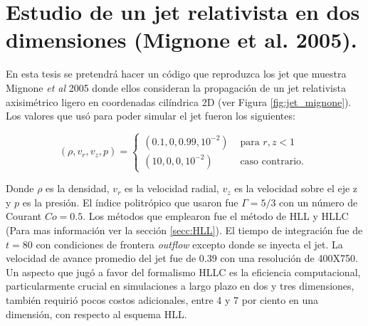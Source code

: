 \documentclass[12pt,a4paper]{book}
\begin{document}
\section{Estudio de un jet relativista en dos dimensiones (Mignone et al. 2005).}
En esta tesis se pretendrá hacer un código que reproduzca los jet que muestra Mignone \emph{et al} 2005 \cite{MB-HLLC-I} donde ellos consideran la propagación de un jet relativista axisimétrico ligero en 
coordenadas cilíndrica 2D (ver Figura \ref{fig:jet_mignone}). Los valores que usó para poder simular el jet fueron los siguientes:

\begin{equation}
  \left(\rho, v_{r}, v_{z}, p\right)=\left\{\begin{array}{ll}
  \left(0.1,0,0.99,10^{-2}\right) & \text { para } r, z<1 \\
  \left(10,0,0,10^{-2}\right) & \text { caso contrario. }
  \end{array}\right.
\end{equation}

Donde $\rho$ es la densidad, $v_r$ es la velocidad radial, $v_z$ es la velocidad sobre el eje z y $p$ es la presión. El índice politrópico que usaron fue $\Gamma = 5/3$ con un número de Courant $Co = 0.5$.
Los métodos que emplearon fue el método de HLL y HLLC (Para mas información ver la sección \ref{secc:HLL}). El tiempo de integración fue de $t = 80$ con condiciones de frontera \emph{outflow} excepto donde se 
inyecta el jet. La velocidad de avance promedio  del jet fue de 0.39 con una resolución de 400X750. Un aspecto que jugó a favor del formalismo HLLC es la eficiencia computacional, particularmente crucial en 
simulaciones a largo plazo en dos y tres dimensiones, también requirió pocos costos adicionales, entre 4 y 7 por ciento en una dimensión, con respecto al esquema HLL. 
\end{document}
